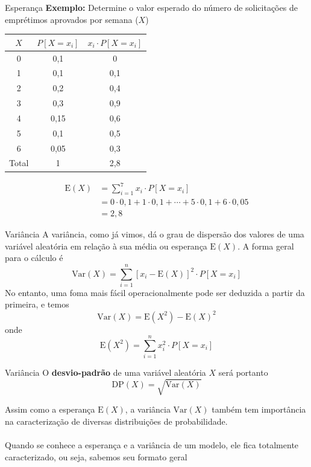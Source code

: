 \documentclass[10pt]{beamer}\usepackage[]{graphicx}\usepackage[]{color}
\providecommand{\E}{\text{E}}
\providecommand{\Var}{\text{Var}}
\providecommand{\DP}{\text{DP}}
\theoremstyle{definition}
\begin{document}
\begin{frame}[fragile]{Esperança}
  \textbf{Exemplo:} Determine o valor esperado do número de solicitações
  de emprétimos aprovados por semana ($X$)
  \begin{table}[h]
    \centering
    \begin{tabular}{ccc}
      \hline
      $X$ & $P[X = x_i]$ & $x_i \cdot P[X=x_i]$ \\
      \hline
      0 & 0,1 & 0 \\
      1 & 0,1 & 0,1 \\
      2 & 0,2 & 0,4 \\
      3 & 0,3 & 0,9 \\
      4 & 0,15 & 0,6  \\
      5 & 0,1 & 0,5\\
      6 & 0,05 & 0,3\\
      \hline
      Total & 1 & 2,8 \\
      \hline
    \end{tabular}
  \end{table}
  \begin{align*}
    \E(X) &= \sum_{i=1}^{7} x_i \cdot P[X = x_i] \\
          &= 0 \cdot 0,1 + 1 \cdot 0,1 + \cdots + 5 \cdot 0,1 + 6 \cdot
          0,05 \\
          &= 2,8
  \end{align*}
\end{frame}

\begin{frame}[fragile]{Variância}
  A variância, como já vimos, dá o grau de dispersão
  dos valores de uma variável aleatória em relação à sua média ou
  esperança $\E(X)$.  A forma geral para o cálculo é
  \begin{equation*}
    \Var(X) = \sum_{i=1}^{n} [x_i - \E(X)]^2 \cdot P[X=x_i]
  \end{equation*}
  No entanto, uma foma mais fácil operacionalmente pode ser deduzida a
  partir da primeira, e temos
  \begin{equation*}
    \Var(X) = \E(X^2) - \E(X)^2
  \end{equation*}
  onde
  \begin{equation*}
    \E(X^2) = \sum_{i = 1}^{n} x_{i}^{2} \cdot P[X = x_i]
  \end{equation*}
\end{frame}

\begin{frame}[fragile]{Variância}
  O \textbf{desvio-padrão} de uma variável aleatória $X$ será portanto
  \begin{equation*}
    \DP(X) = \sqrt{\Var(X)}
  \end{equation*}

  \vspace{1em}
  Assim como a esperança $\E(X)$, a variância $\Var(X)$ também tem
  importância na caracterização de diversas distribuições de
  probabilidade. \\~\\
  Quando se conhece a esperança e a variância de um modelo, ele fica
  totalmente caracterizado, ou seja, sabemos seu formato geral
\end{frame}
\end{document}
